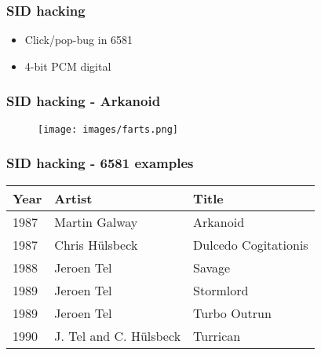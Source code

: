 
\begin{frame}
\frametitle{SID hacking}

\begin{itemize}
\item Click/pop-bug in 6581
\item 4-bit PCM digital
\end{itemize}

\end{frame}


\begin{frame}
\frametitle{SID hacking - Arkanoid}

\begin{figure}
\texttt{[image: images/farts.png]}
\end{figure}

\end{frame}


\begin{frame}
\frametitle{SID hacking - 6581 examples}

\begin{tabular}{|l|l|l|}
\hline Year & Artist & Title \\ \hline
1987 & Martin Galway & Arkanoid \\
1987 & Chris H\"ulsbeck & Dulcedo Cogitationis \\
1988 & Jeroen Tel & Savage \\
1989 & Jeroen Tel & Stormlord \\
1989 & Jeroen Tel & Turbo Outrun \\
1990 & J. Tel and C. H\"ulsbeck & Turrican \\ \hline
\end{tabular}

\end{frame}
